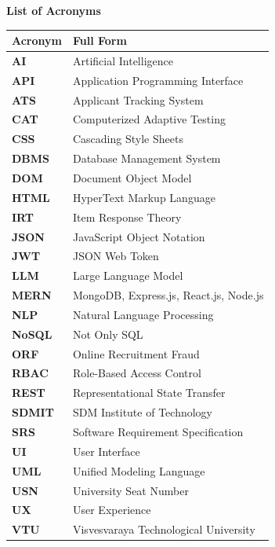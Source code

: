 \begin{center}
\vspace*{-0.2cm}
{\fontsize{18pt}{22pt}\selectfont \textbf{List of Acronyms}}
\end{center}

\vspace{0.6cm}
\noindent
\begin{tabular}{ll}
\textbf{Acronym} & \textbf{Full Form} \\
\hline
\textbf{AI}   & Artificial Intelligence \\
\textbf{API}  & Application Programming Interface \\
\textbf{ATS}  & Applicant Tracking System \\
\textbf{CAT}  & Computerized Adaptive Testing \\
\textbf{CSS}  & Cascading Style Sheets \\
\textbf{DBMS} & Database Management System \\
\textbf{DOM}  & Document Object Model \\
\textbf{HTML} & HyperText Markup Language \\
\textbf{IRT}  & Item Response Theory \\
\textbf{JSON} & JavaScript Object Notation \\
\textbf{JWT}  & JSON Web Token \\
\textbf{LLM}  & Large Language Model \\
\textbf{MERN} & MongoDB, Express.js, React.js, Node.js \\
\textbf{NLP}  & Natural Language Processing \\
\textbf{NoSQL}& Not Only SQL \\
\textbf{ORF}  & Online Recruitment Fraud \\
\textbf{RBAC} & Role-Based Access Control \\
\textbf{REST} & Representational State Transfer \\
\textbf{SDMIT}& SDM Institute of Technology \\
\textbf{SRS}  & Software Requirement Specification \\
\textbf{UI}   & User Interface \\
\textbf{UML}  & Unified Modeling Language \\
\textbf{USN}  & University Seat Number \\
\textbf{UX}   & User Experience \\
\textbf{VTU}  & Visvesvaraya Technological University \\
\hline
\end{tabular}